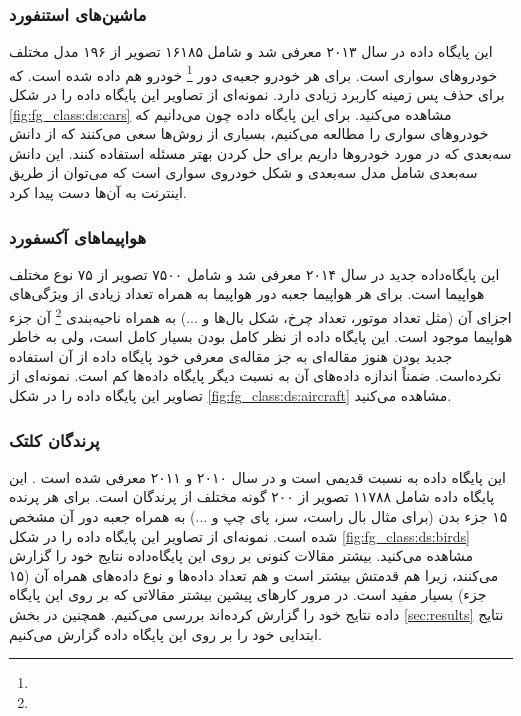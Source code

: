 \documentclass[11pt]{article}
\begin{document}
\subsubsection{ماشین‌های استنفورد}
این پایگاه داده در سال ۲۰۱۳ معرفی شد
\cite{stanford_cars}
و شامل ۱۶۱۸۵ تصویر از ۱۹۶ مدل مختلف خودروهای سواری است. برای هر خودرو جعبه‌ی دور
\footnote{}
خودرو هم داده شده است. که برای حذف پس زمینه کاربرد زیادی دارد. نمونه‌ای از تصاویر این پایگاه داده را در شکل
\ref{fig:fg_class:ds:cars}
مشاهده می‌کنید. برای این پایگاه داده چون می‌دانیم که خودروهای سواری را مطالعه می‌کنیم، بسیاری از روش‌ها
\cite{stanford_cars, krause2014, ramnath2014}
سعی می‌کنند که از دانش سه‌بعدی که در مورد خودروها داریم برای حل کردن بهتر مسئله استفاده کنند. این دانش سه‌بعدی شامل مدل سه‌بعدی و شکل خودروی سواری است که می‌توان از طریق اینترنت به آن‌ها دست پیدا کرد.

\subsubsection{هواپیماهای آکسفورد}
این پایگاه‌داده جدید در سال ۲۰۱۴ معرفی شد
\cite{oxford_aircraft}
و شامل ۷۵۰۰ تصویر از ۷۵ نوع مختلف هواپیما است. برای هر هواپیما جعبه دور هواپیما به همراه تعداد زیادی از ویژگی‌های اجزای آن (مثل تعداد موتور، تعداد چرخ، شکل بال‌ها و ...) به همراه ناحیه‌بندی
\footnote{}
آن جزء هواپیما موجود است. این پایگاه داده از نظر کامل بودن بسیار کامل است، ولی به خاطر جدید بودن هنوز مقاله‌ای به جز مقاله‌ی معرفی خود پایگاه داده از آن استفاده نکرده‌است. ضمناً اندازه داده‌های آن به نسبت دیگر پایگاه داده‌ها کم است. نمونه‌ای از تصاویر این پایگاه داده را در شکل
\ref{fig:fg_class:ds:aircraft}
مشاهده می‌کنید.

\subsubsection{پرندگان کلتک}
این پایگاه داده به نسبت قدیمی است و در سال ۲۰۱۰ و ۲۰۱۱ معرفی شده است
\cite{cub2002011, cub2002010}.
این پایگاه داده شامل ۱۱۷۸۸ تصویر از ۲۰۰ گونه مختلف از پرندگان است. برای هر پرنده ۱۵ جزء بدن (برای مثال بال راست، سر، پای چپ و ...) به همراه جعبه دور آن مشخص شده است. نمونه‌ای از تصاویر این پایگاه داده را در شکل
\ref{fig:fg_class:ds:birds}
مشاهده می‌کنید. بیشتر مقالات کنونی بر روی این پایگاه‌داده نتایج خود را گزارش می‌کنند، زیرا هم قدمتش بیشتر است و هم تعداد داده‌ها و نوع داده‌های همراه آن (۱۵ جزء) بسیار مفید است. در مرور کارهای پیشین بیشتر مقالاتی که بر روی این پایگاه داده نتایج خود را گزارش کرده‌اند بررسی می‌کنیم. همچنین در بخش
\ref{sec:results}
نتایج ابتدایی خود را بر روی این پایگاه داده گزارش می‌کنیم.
\end{document}
